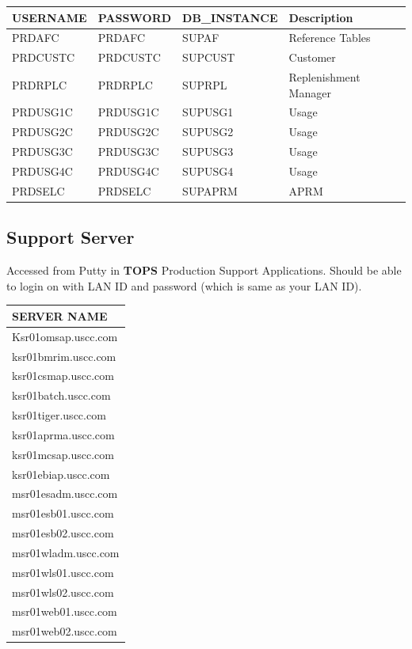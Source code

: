 \documentclass[12pt,twoside]{article}
\begin{document}
\begin{center}
\begin{tabular}{llll}
\hline
 \textbf{USERNAME}  &  \textbf{PASSWORD}  &  \textbf{DB\_INSTANCE}  &  \textbf{Description}   \\
\hline
 PRDAFC             &  PRDAFC             &  SUPAF                  &  Reference Tables       \\
 PRDCUSTC           &  PRDCUSTC           &  SUPCUST                &  Customer               \\
 PRDRPLC            &  PRDRPLC            &  SUPRPL                 &  Replenishment Manager  \\
 PRDUSG1C           &  PRDUSG1C           &  SUPUSG1                &  Usage                  \\
 PRDUSG2C           &  PRDUSG2C           &  SUPUSG2                &  Usage                  \\
 PRDUSG3C           &  PRDUSG3C           &  SUPUSG3                &  Usage                  \\
 PRDUSG4C           &  PRDUSG4C           &  SUPUSG4                &  Usage                  \\
 PRDSELC            &  PRDSELC            &  SUPAPRM                &  APRM                   \\
\hline
\end{tabular}
\end{center}


\normalsize
\subsection{Support Server}
\label{sec-10-2}

   Accessed from Putty in \textbf{TOPS} Production Support Applications.
   Should be able to login on with LAN ID and password (which is same as your LAN ID).

\begin{center}
\begin{tabular}{l}
\hline
 \textbf{SERVER NAME}  \\
\hline
 Ksr01omsap.uscc.com   \\
 ksr01bmrim.uscc.com   \\
 ksr01csmap.uscc.com   \\
 ksr01batch.uscc.com   \\
 ksr01tiger.uscc.com   \\
 ksr01aprma.uscc.com   \\
 ksr01mcsap.uscc.com   \\
 ksr01ebiap.uscc.com   \\
 msr01esadm.uscc.com   \\
 msr01esb01.uscc.com   \\
 msr01esb02.uscc.com   \\
 msr01wladm.uscc.com   \\
 msr01wls01.uscc.com   \\
 msr01wls02.uscc.com   \\
 msr01web01.uscc.com   \\
 msr01web02.uscc.com   \\
\hline
\end{tabular}
\end{center}
\end{document}
